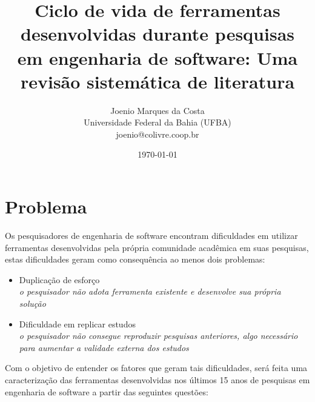 \documentclass[12pt]{article}
\title{Ciclo de vida de ferramentas desenvolvidas durante pesquisas em
        engenharia de software: Uma revisão sistemática de literatura
}
\author{Joenio Marques da Costa\\
  {\small Universidade Federal da Bahia (UFBA)} \\
  {\small joenio@colivre.coop.br}
}
\date{\today}
\begin{document}
\maketitle


\section{Problema}

%

Os pesquisadores de engenharia de software encontram dificuldades em utilizar
ferramentas desenvolvidas pela própria comunidade acadêmica em suas pesquisas,
estas dificuldades geram como consequência ao menos dois problemas:

\begin{itemize}
\item Duplicação de esforço\\
        {\it o pesquisador não adota ferramenta existente e desenvolve sua
        própria solução}
\item Dificuldade em replicar estudos\\
        {\it o pesquisador não consegue reproduzir pesquisas anteriores,
        algo necessário para aumentar a validade externa dos estudos}
\end{itemize}

Com o objetivo de entender os fatores que geram tais dificuldades, será feita
uma caracterização das ferramentas desenvolvidas nos últimos 15 anos de
pesquisas em engenharia de software a partir das seguintes questões:
\end{document}
